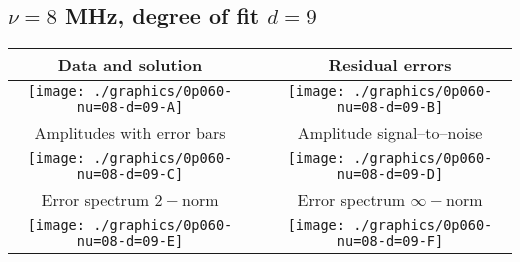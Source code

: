 

% 

\clearpage{}
\break{}

\subsection{$\nu = 8$ MHz, degree of fit $d = 9$}

\begin{table}[h]
    \begin{center}
        \begin{tabular}{ccc}
            Data and solution & \quad & Residual errors \\\hline
            \texttt{[image: ./graphics/0p060-nu=08-d=09-A]} &&
            \texttt{[image: ./graphics/0p060-nu=08-d=09-B]} \\[15pt]
            Amplitudes with error bars && Amplitude signal--to--noise \\\hline
            \texttt{[image: ./graphics/0p060-nu=08-d=09-C]} &&
            \texttt{[image: ./graphics/0p060-nu=08-d=09-D]} \\[15pt]
            Error spectrum $2-$norm && Error spectrum $\infty-$norm \\\hline
            \texttt{[image: ./graphics/0p060-nu=08-d=09-E]} &&
            \texttt{[image: ./graphics/0p060-nu=08-d=09-F]} \\[15pt]
        \end{tabular}
    \end{center}
\label{fig:elev=60, nu=8}
\end{table}



\endinput
